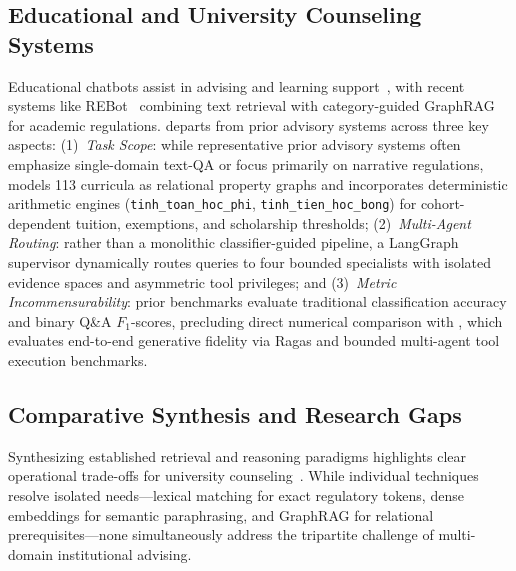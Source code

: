 \subsection{Educational and University Counseling Systems}
\label{sec:educational_counseling}

Educational chatbots assist in advising and learning support~\cite{wollny2021chatbots}, with recent systems like REBot~\cite{ma2025rebot} combining text retrieval with category-guided GraphRAG for academic regulations. \system{} departs from prior advisory systems across three key aspects: (1)~\emph{Task Scope}: while representative prior advisory systems often emphasize single-domain text-QA or focus primarily on narrative regulations, \system{} models 113 curricula as relational property graphs and incorporates deterministic arithmetic engines (\texttt{tinh\_toan\_hoc\_phi}, \texttt{tinh\_tien\_hoc\_bong}) for cohort-dependent tuition, exemptions, and scholarship thresholds; (2)~\emph{Multi-Agent Routing}: rather than a monolithic classifier-guided pipeline, a LangGraph supervisor dynamically routes queries to four bounded specialists with isolated evidence spaces and asymmetric tool privileges; and (3)~\emph{Metric Incommensurability}: prior benchmarks evaluate traditional classification accuracy and binary Q\&A $F_1$-scores, precluding direct numerical comparison with \system{}, which evaluates end-to-end generative fidelity via Ragas and bounded multi-agent tool execution benchmarks.

\subsection{Comparative Synthesis and Research Gaps}
\label{sec:gaps}

Synthesizing established retrieval and reasoning paradigms highlights clear operational trade-offs for university counseling~\cite{cormack2009rrf,edge2024graphrag,jeong2024adaptiverag,karpukhin2020dpr,robertson2009bm25,schick2023toolformer,wu2023autogen,yao2023react}. While individual techniques resolve isolated needs---lexical matching for exact regulatory tokens, dense embeddings for semantic paraphrasing, and GraphRAG for relational prerequisites---none simultaneously address the tripartite challenge of multi-domain institutional advising. 

